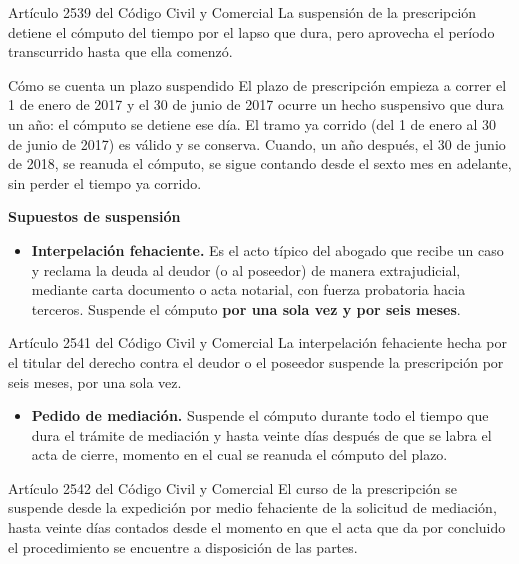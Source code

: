 \documentclass[12pt,oneside]{book}
\begin{document}
\begin{articulo}{Artículo 2539 del Código Civil y Comercial}
La suspensión de la prescripción detiene el cómputo del tiempo por el lapso que dura, pero aprovecha el período transcurrido hasta que ella comenzó.
\end{articulo}

\begin{example}{Cómo se cuenta un plazo suspendido}
El plazo de prescripción empieza a correr el 1 de enero de 2017 y el 30 de junio de 2017 ocurre un hecho suspensivo que dura un año: el cómputo se detiene ese día. El tramo ya corrido (del 1 de enero al 30 de junio de 2017) es válido y se conserva. Cuando, un año después, el 30 de junio de 2018, se reanuda el cómputo, se sigue contando desde el sexto mes en adelante, sin perder el tiempo ya corrido.
\end{example}

\textbf{Supuestos de suspensión}

\begin{itemize}
    \item \textbf{Interpelación fehaciente.} Es el acto típico del abogado que recibe un caso y reclama la deuda al deudor (o al poseedor) de manera extrajudicial, mediante carta documento o acta notarial, con fuerza probatoria hacia terceros. Suspende el cómputo \textbf{por una sola vez y por seis meses}.
\end{itemize}

\begin{articulo}{Artículo 2541 del Código Civil y Comercial}
La interpelación fehaciente hecha por el titular del derecho contra el deudor o el poseedor suspende la prescripción por seis meses, por una sola vez.
\end{articulo}

\begin{itemize}
    \item \textbf{Pedido de mediación.} Suspende el cómputo durante todo el tiempo que dura el trámite de mediación y hasta veinte días después de que se labra el acta de cierre, momento en el cual se reanuda el cómputo del plazo.
\end{itemize}

\begin{articulo}{Artículo 2542 del Código Civil y Comercial}
El curso de la prescripción se suspende desde la expedición por medio fehaciente de la solicitud de mediación, hasta veinte días contados desde el momento en que el acta que da por concluido el procedimiento se encuentre a disposición de las partes.
\end{articulo}
\end{document}
